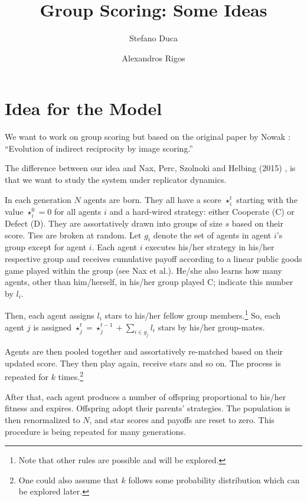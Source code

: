 \documentclass[12pt,a4paper]{article}
\title{Group Scoring: Some Ideas}
\author{Stefano Duca \and Alexandros Rigos}
\begin{document}
\maketitle
\section{Idea for the Model}

We want to work on group scoring but based on the original paper by Nowak \cite{Nowak1998}: ``Evolution of indirect reciprocity by image scoring.''

The difference between our idea and  Nax, Perc, Szolnoki and Helbing (2015) \cite{Nax2015}, is that we want to study the system under replicator dynamics.

In each generation $N$ agents are born. They all have a score $\star_i^t$ starting with the value $\star_i^0=0$ for all agents $i$ and a hard-wired strategy: either Cooperate (C) or Defect (D). They are assortatively drawn into groups of size $s$ based on their score. Ties are broken at random. Let $g_i$ denote the set of agents in agent $i$'s group except for agent $i$. Each agent $i$ executes his/her strategy in his/her respective group and receives cumulative payoff according to a linear public goods game played within the group (see Nax et al.\cite{Nax2015}). He/she also learns how many agents, other than him/herself, in his/her group played C; indicate this number by $l_i$.

Then, each agent assigns $l_i$ stars to his/her fellow group members.\footnote{Note that other rules are possible and will be explored.} So, each agent $j$ is assigned $\star_j^t=\star_j^{t-1}+\sum_{i\in g_j} l_i$ stars by his/her group-mates. 

Agents are then pooled together and assortatively re-matched based on their updated score. They then play again, receive stars and so on. The process is repeated for $k$ times.\footnote{One could also assume that $k$ follows some probability distribution which can be explored later.} 

After that, each agent produces a number of offspring proportional to his/her fitness and expires. Offspring adopt their parents' strategies. The population is then renormalized to $N$, and star scores and payoffs are reset to zero. This procedure is being repeated for many generations.
\end{document}
